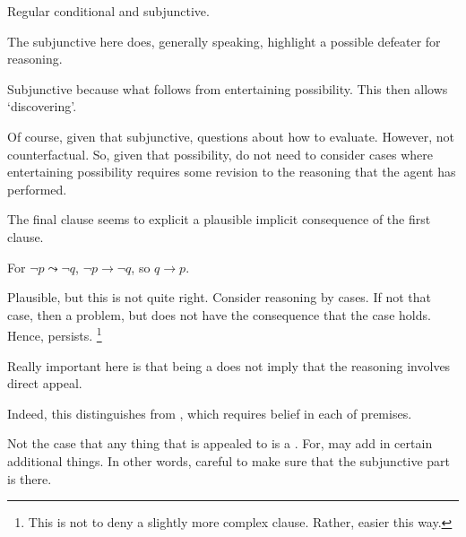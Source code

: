 \begin{note}
  Regular conditional and subjunctive.
\end{note}

\begin{note}
  The subjunctive here does, generally speaking, highlight a possible defeater for reasoning.

  Subjunctive because what follows from entertaining possibility.
  This then allows `discovering'.

  Of course, given that subjunctive, questions about how to evaluate.
  However, not counterfactual.
  So, given that possibility, do not need to consider cases where entertaining possibility requires some revision to the reasoning that the agent has performed.

  The final clause seems to explicit a plausible implicit consequence of the first clause.

  For \(\lnot p \leadsto \lnot q\), \(\lnot p \rightarrow \lnot q\), so \(q \rightarrow p\).

  Plausible, but this is not quite right.
  Consider reasoning by cases.
  If not that case, then a problem, but does not have the consequence that the case holds.
  Hence, persists.\nolinebreak
  \footnote{
    This is not to deny a slightly more complex clause.
    Rather, easier this way.
  }
\end{note}

\begin{note}
  Really important here is that being a \requ{} does not imply that the reasoning involves direct appeal.

  {
    \color{red}
    Indeed, this distinguishes from \citeauthor{Sgaravatti:2013wu}, which requires belief in each of premises.
  }
\end{note}

\begin{note}
  Not the case that any thing that is appealed to is a \requ{}.
  For, may add in certain additional things.
  In other words, careful to make sure that the subjunctive part is there.
\end{note}


